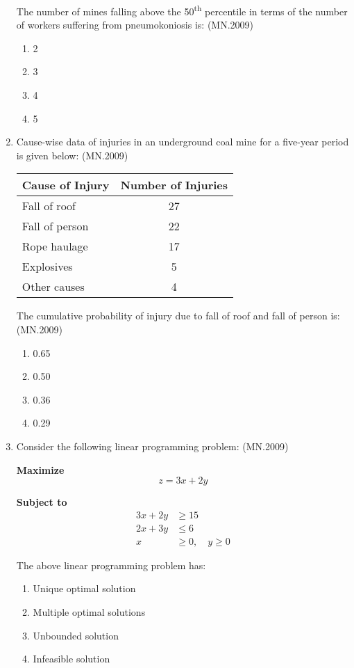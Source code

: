 \documentclass[journal]{IEEEtran}
\numberwithin{equation}{enumi}
\numberwithin{figure}{enumi}
\begin{document}
\begin{enumerate}
The number of mines falling above the 50\textsuperscript{th} percentile in terms of the number of workers suffering from pneumokoniosis is:
\hfill{(MN.2009)}
\begin{enumerate}[label=(\Alph*)]
\item 2
\item 3
\item 4
\item 5
\end{enumerate}

\item Cause-wise data of injuries in an underground coal mine for a five-year period is given below:
\hfill{(MN.2009)}

\begin{center}
\begin{tabular}{|>{\raggedright}p{6cm}|c|}
\hline
\textbf{Cause of Injury} & \textbf{Number of Injuries} \\
\hline
Fall of roof & 27 \\
Fall of person & 22 \\
Rope haulage & 17 \\
Explosives & 5 \\
Other causes & 4 \\
\hline
\end{tabular}
\end{center}

The cumulative probability of injury due to fall of roof and fall of person is:
\hfill{(MN.2009)}
\begin{enumerate}[label=(\Alph*)]
\item 0.65
\item 0.50
\item 0.36
\item 0.29
\end{enumerate}

\item Consider the following linear programming problem:
\hfill{(MN.2009)}

\textbf{Maximize}
\[
z = 3x + 2y
\]

\textbf{Subject to}
\[
\begin{aligned}
3x + 2y &\geq 15 \\
2x + 3y &\leq 6 \\
x &\geq 0,\quad y \geq 0
\end{aligned}
\]

The above linear programming problem has:

\begin{enumerate}[label=(\Alph*)]
\item Unique optimal solution
\item Multiple optimal solutions
\item Unbounded solution
\item Infeasible solution
\end{enumerate}


\end{enumerate}
\end{document}
